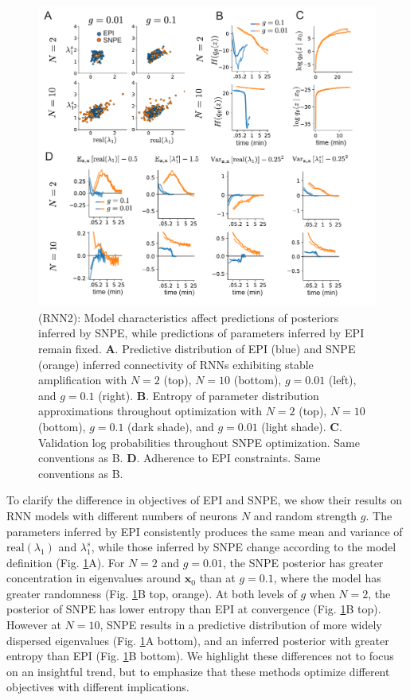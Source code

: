 \documentclass[11pt]{article}
\begin{document}
\begin{figure}
\begin{center}
\includegraphics[scale=0.8]{figures/figRNN1/figRNN1.pdf}
\end{center}
\caption{\small (RNN2): Model characteristics affect predictions of posteriors inferred by SNPE, while predictions of parameters inferred by EPI remain fixed.
\textbf{A}. Predictive distribution of EPI (blue) and SNPE (orange) inferred connectivity of RNNs exhibiting stable amplification with $N=2$ (top), $N=10$ (bottom), $g=0.01$ (left), and $g=0.1$ (right).
\textbf{B}. Entropy of parameter distribution approximations throughout optimization with $N=2$ (top), $N=10$ (bottom), $g=0.1$ (dark shade), and $g=0.01$ (light shade).
\textbf{C}. Validation log probabilities throughout SNPE optimization. Same conventions as B.
\textbf{D}. Adherence to EPI constraints. Same conventions as B.
}
\label{fig:RNN2}
\end{figure}

To clarify the difference in objectives of EPI and SNPE, we show their results on RNN models with different numbers of neurons $N$ and random strength $g$.  
The parameters inferred by EPI consistently produces the same mean and variance of $\text{real}(\lambda_1)$ and $\lambda_1^s$, while those inferred by SNPE change according to the model definition (Fig. \ref{fig:RNN2}A).
For $N=2$ and $g=0.01$, the SNPE posterior has greater concentration in eigenvalues around $\mathbf{x}_0$ than at $g=0.1$, where the model has greater randomness (Fig. \ref{fig:RNN2}B top, orange).
At both levels of $g$ when $N=2$, the posterior of SNPE has lower entropy than EPI at convergence (Fig. \ref{fig:RNN2}B top).
However at $N=10$, SNPE results in a predictive distribution of more widely dispersed eigenvalues (Fig. \ref{fig:RNN2}A bottom), and an inferred posterior with greater entropy than EPI (Fig. \ref{fig:RNN2}B bottom).
We highlight these differences not to focus on an insightful trend, but to emphasize that these methods optimize different objectives with different implications.
\end{document}
